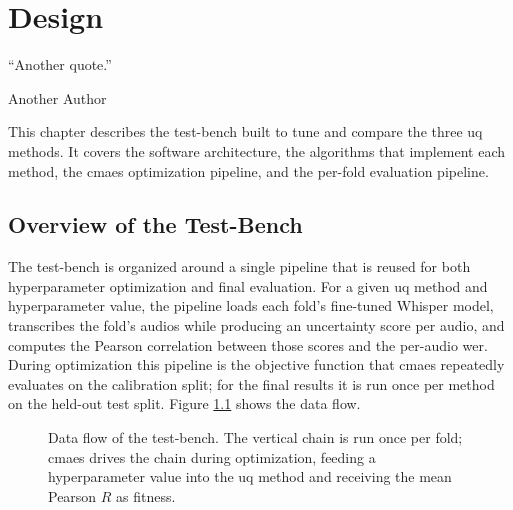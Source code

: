 \chapter{Design}
\epigraph{``Another quote.''}{\vspace{10pt}Another Author}
\label{chapter:design}
\newpage

This chapter describes the test-bench built to tune and compare the three \acrshort{uq} methods. It covers the software architecture, the algorithms that implement each method, the \acrshort{cmaes} optimization pipeline, and the per-fold evaluation pipeline.

\section{Overview of the Test-Bench}

The test-bench is organized around a single pipeline that is reused for both hyperparameter optimization and final evaluation. For a given \acrshort{uq} method and hyperparameter value, the pipeline loads each fold's fine-tuned Whisper model, transcribes the fold's audios while producing an uncertainty score per audio, and computes the Pearson correlation between those scores and the per-audio \acrshort{wer}. During optimization this pipeline is the objective function that \acrshort{cmaes} repeatedly evaluates on the calibration split; for the final results it is run once per method on the held-out test split. Figure \ref{fig:pipeline} shows the data flow.

\begin{figure}[ht]
	\centering
	\caption{Data flow of the test-bench. The vertical chain is run once per fold; \acrshort{cmaes} drives the chain during optimization, feeding a hyperparameter value into the \acrshort{uq} method and receiving the mean Pearson $R$ as fitness.}
	\label{fig:pipeline}
\end{figure}

